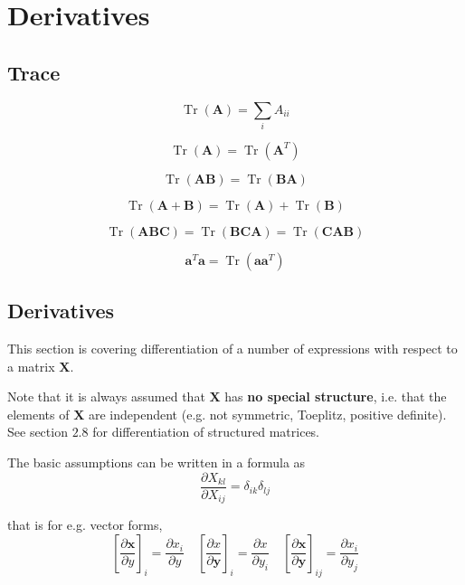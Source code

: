 \chapter{Derivatives}

\section{Trace}

$$ \operatorname{Tr}(\mathbf{A})=\sum_{i} A_{i i} $$

$$ \operatorname{Tr}(\mathbf{A})=\operatorname{Tr}\left(\mathbf{A}^{T}\right) $$

$$ \operatorname{Tr}(\mathbf{A B})=\operatorname{Tr}(\mathbf{B A}) $$

$$ \operatorname{Tr}(\mathbf{A}+\mathbf{B})=\operatorname{Tr}(\mathbf{A})+\operatorname{Tr}(\mathbf{B}) $$

$$ \operatorname{Tr}(\mathbf{A B C})=\operatorname{Tr}(\mathbf{B C A})=\operatorname{Tr}(\mathbf{C A B}) $$

$$ \mathbf{a}^{T} \mathbf{a}=\operatorname{Tr}\left(\mathbf{a a}^{T}\right) $$

\section{Derivatives}

This section is covering differentiation of a number of expressions with respect to a matrix $ \mathbf{X} $. 

Note that it is always assumed that $ \mathbf{X} $ has \textbf{no special structure}, i.e. that the elements of $ \mathbf{X} $ are independent (e.g. not symmetric, Toeplitz, positive definite). See section $ 2.8 $ for differentiation of structured matrices. 

\begin{theorem}
    The basic assumptions can be written in a formula as
$$
\frac{\partial X_{k l}}{\partial X_{i j}}=\delta_{i k} \delta_{l j}
$$
\end{theorem}


that is for e.g. vector forms,
$$
\left[\frac{\partial \mathbf{x}}{\partial y}\right]_{i}=\frac{\partial x_{i}}{\partial y} \quad\left[\frac{\partial x}{\partial \mathbf{y}}\right]_{i}=\frac{\partial x}{\partial y_{i}} \quad\left[\frac{\partial \mathbf{x}}{\partial \mathbf{y}}\right]_{i j}=\frac{\partial x_{i}}{\partial y_{j}}
$$


